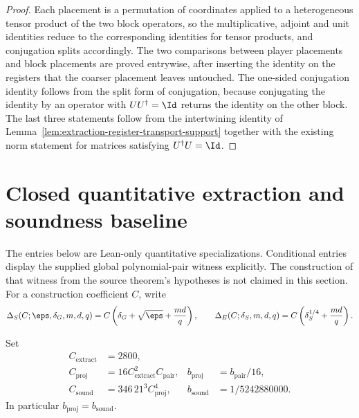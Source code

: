 \begin{proof}
	\leanok
	Each placement is a permutation of coordinates applied to a heterogeneous tensor product of the two block operators, so the multiplicative, adjoint and unit identities reduce to the corresponding identities for tensor products, and conjugation splits accordingly.  The two comparisons between player placements and block placements are proved entrywise, after inserting the identity on the registers that the coarser placement leaves untouched.  The one-sided conjugation identity follows from the split form of conjugation, because conjugating the identity by an operator with $UU^\dagger = \Id$ returns the identity on the other block.  The last three statements follow from the intertwining identity of Lemma~\ref{lem:extraction-register-transport-support} together with the existing norm statement for matrices satisfying $U^\dagger U = \Id$.
\end{proof}

\section{Closed quantitative extraction and soundness baseline}
\label{sec:qld-extraction-explicit}

The entries below are Lean-only quantitative specializations.  Conditional
entries display the supplied global polynomial-pair witness explicitly.  The
construction of that witness from the source theorem's hypotheses is not
claimed in this section.
For a construction coefficient $C$, write
\[
 \Delta_S(C;\eps,\delta_G,m,d,q)
   =C\left(\delta_G+\sqrt\eps+\frac{md}{q}\right),
 \qquad
 \Delta_E(C;\delta_S,m,d,q)
   =C\left(\delta_S^{1/4}+\frac{md}{q}\right).
\]

\begin{definition}
\label{def:qld-extraction-baseline-constants}
\leanok
{}
Set
\[
 \begin{aligned}
 C_{\mathrm{extract}}&=2800,\\
 C_{\mathrm{proj}}&=16C_{\mathrm{extract}}^2C_{\mathrm{pair}},
 &b_{\mathrm{proj}}&=b_{\mathrm{pair}}/16,\\
 C_{\mathrm{sound}}&=346\,21^3C_{\mathrm{proj}}^4,
 &b_{\mathrm{sound}}&=1/5242880000.
 \end{aligned}
\]
In particular $b_{\mathrm{proj}}=b_{\mathrm{sound}}$.
\end{definition}


